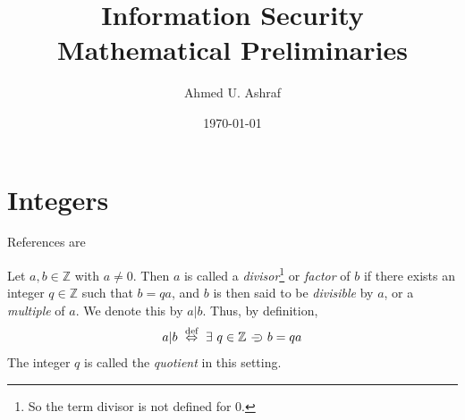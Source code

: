 \documentclass[a4paper, 12pt]{book} %
\title{Information Security \\ Mathematical Preliminaries}
\author{Ahmed U. Ashraf}
\date{\today }
\begin{document}
% 


\maketitle


\tableofcontents\label{toc}












\chapter{Integers}

References are \cite{slinko2015algebra, childs2019cryptology,silverman2008introduction, shemanske2017modern}


Let $a, b \in \mathbb{Z}$ with $a \neq 0$. Then $a$ is called a \emph{divisor}\footnote{So the term divisor is not defined for $0$.} or \emph{factor} of $b$ if there exists an integer $q \in \mathbb{Z}$ such that $b = qa$, and $b$ is then said to be \emph{divisible} by $a$, or a \emph{multiple} of $a$. We denote this by $a|b$. Thus, by definition,
\begin{align}
    a|b ~\overset{\text{def}}{\Leftrightarrow}~\exists~q \in \mathbb{Z} \hspace{2mm}{\supset}\kern-1em{-} \hspace{2mm} b = qa
\end{align}
The integer $q$ is called the \emph{quotient} in this setting.
\end{document}
